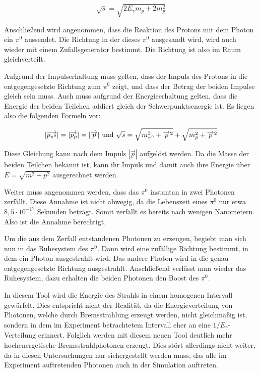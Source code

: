 \documentclass[a4paper,11pt,oneside,final,german,openbib,pdftex]{scrbook}
\begin{document}
{\begin{equation}
\sqrt{s}= \sqrt{2E_{\gamma}m_p+2m_p^2}
\end{equation}

Anschlie{\ss}end wird angenommen, dass die Reaktion des Protons mit dem Photon ein $\pi^0$ aussendet. Die Richtung in der dieses $\pi^0$ ausgesandt wird, wird auch wieder mit einem Zufallsgenerator bestimmt. Die Richtung ist also im Raum gleichverteilt.

Aufgrund der Impulserhaltung muss gelten, dass der Impuls des Protons in die entgegengesetzte Richtung zum $\pi^0$ zeigt, und dass der Betrag der beiden Impulse gleich sein muss. Auch muss aufgrund der Energieerhaltung gelten, dass die Energie der beiden Teilchen addiert gleich der Schwerpunktsenergie ist. Es liegen also die folgenden Formeln vor:


\begin{equation}
|\overrightarrow{p_{\pi^0}}|=|\overrightarrow{p_p}| = |\overrightarrow{p}| \textnormal{  und  } \sqrt{s}=\sqrt{m_{\pi^0}^2+\overrightarrow{p}^2} + \sqrt{m_{p}^2+\overrightarrow{p}^2}
\end{equation}


Diese Gleichung kann nach dem Impuls $|\overrightarrow{p}|$ aufgel\"ost werden. Da die Masse der beiden Teilchen bekannt ist, kann ihr Impuls und damit auch ihre Energie über $E=\sqrt{m^2+p^2}$ ausgerechnet werden. 

Weiter muss angenommen werden, dass das $\pi^0$ instantan in zwei Photonen zerf\"allt. Diese Annahme ist nicht abwegig, da die Lebenszeit eines $\pi^0$ nur etwa $8,5\cdot10^{-17}$ Sekunden betr\"agt. Somit zerf\"allt es bereits nach wenigen Nanometern. Also ist die Annahme berechtigt.

Um die aus dem Zerfall entstandenen Photonen zu erzeugen, begiebt man sich nun in das Ruhesystem des $\pi^0$. Dann wird eine zuf\"allige Richtung bestimmt, in dem ein Photon ausgestrahlt wird. Das andere Photon wird in die genau entgegengesetzte Richtung ausgestrahlt. Anschlie{\ss}end verl\"asst man wieder das Ruhesystem, dazu erhalten die beiden Photonen den Boost des $\pi^0$. 
\newline


In diesem Tool wird die Energie des Strahls in einem homogenen Intervall gew\"urfelt. Dies entspricht nicht der Realit\"at, da die Energieverteilung von Photonen, welche durch Bremsstrahlung erzeugt werden, nicht gleichm\"a{\ss}ig ist, sondern in dem im Experiment betrachtetem Intervall eher an eine $1/E_{\gamma}$-Verteilung erinnert. Folglich werden mit diesem neuen Tool deutlich mehr hochenergetische Bremsstrahlphotonen erzeugt. Dies st\"ort allerdings nicht weiter, da in diesen Untersuchungen nur sichergestellt werden muss, das alle im Experiment auftretenden Photonen auch in der Simulation auftreten.

}
\end{document}
